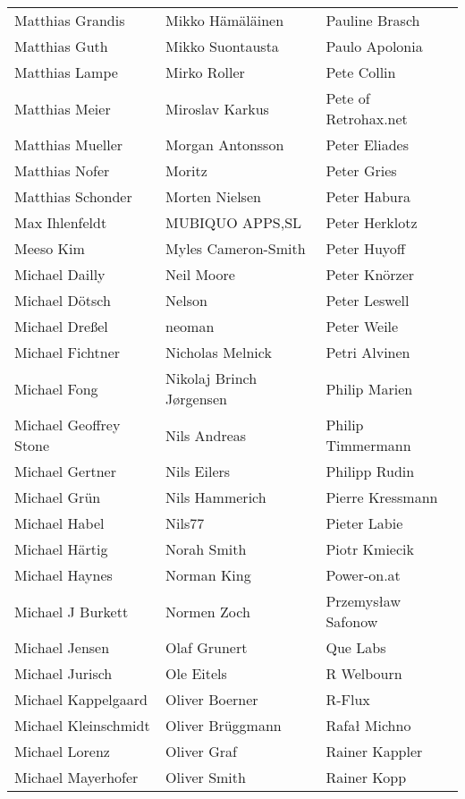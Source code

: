 \begin{small}
\begin{tabular}{p{4cm}p{4cm}p{4cm}}
\end{tabular}
\newpage
\setlength{\tabcolsep}{1mm}
\begin{tabular}{p{4cm}p{4cm}p{4cm}}
Matthias Grandis & Mikko Hämäläinen & Pauline Brasch \\
Matthias Guth & Mikko Suontausta & Paulo Apolonia \\
Matthias Lampe & Mirko Roller & Pete Collin \\
Matthias Meier & Miroslav Karkus & Pete of Retrohax.net \\
Matthias Mueller & Morgan Antonsson & Peter Eliades \\
Matthias Nofer & Moritz & Peter Gries \\
Matthias Schonder & Morten Nielsen & Peter Habura \\
Max Ihlenfeldt & MUBIQUO APPS,SL & Peter Herklotz \\
Meeso Kim & Myles Cameron-Smith & Peter Huyoff \\
Michael Dailly & Neil Moore & Peter Knörzer \\
Michael Dötsch & Nelson & Peter Leswell \\
Michael Dreßel & neoman & Peter Weile \\
Michael Fichtner & Nicholas Melnick & Petri Alvinen \\
Michael Fong & Nikolaj Brinch Jørgensen & Philip Marien \\
Michael Geoffrey Stone & Nils Andreas & Philip Timmermann \\
Michael Gertner & Nils Eilers & Philipp Rudin \\
Michael Grün & Nils Hammerich & Pierre Kressmann \\
Michael Habel & Nils77 & Pieter Labie \\
Michael Härtig & Norah Smith & Piotr Kmiecik \\
Michael Haynes & Norman King & Power-on.at \\
Michael J Burkett & Normen Zoch & Przemysław Safonow \\
Michael Jensen & Olaf Grunert & Que Labs \\
Michael Jurisch & Ole Eitels & R Welbourn \\
Michael Kappelgaard & Oliver Boerner & R-Flux \\
Michael Kleinschmidt & Oliver Brüggmann & Rafał Michno \\
Michael Lorenz & Oliver Graf & Rainer Kappler \\
Michael Mayerhofer & Oliver Smith & Rainer Kopp \\

\end{tabular}
\end{small}
